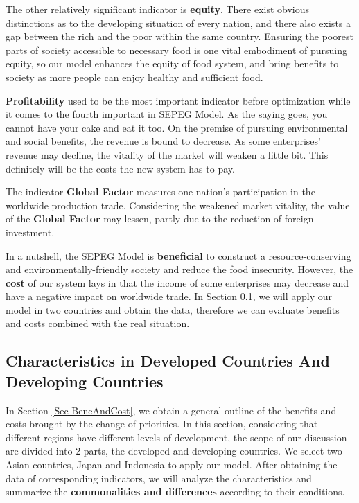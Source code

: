 \documentclass{mcmthesis}
\begin{document}
The other relatively significant indicator is \textbf{equity}. There exist obvious distinctions as to the developing situation of every nation, and there also exists a gap between the rich and the poor within the same country. Ensuring the poorest parts of society accessible to necessary food is one vital embodiment of pursuing equity, so our model enhances the equity of food system, and bring benefits to society as more people can enjoy healthy and sufficient food.

\textbf{Profitability} used to be the most important indicator before optimization while it comes to the fourth important in SEPEG Model. As the saying goes, you cannot have your cake and eat it too. On the premise of pursuing environmental and social benefits, the revenue is bound to decrease. As some enterprises' revenue may decline, the vitality of the market will weaken a little bit. This definitely will be the costs the new system has to pay.

The indicator \textbf{Global Factor} measures one nation's participation in the worldwide production trade. Considering the weakened market vitality, the value of the \textbf{Global Factor} may lessen, partly due to the reduction of foreign investment. 

In a nutshell, the SEPEG Model is \textbf{beneficial} to construct a resource-conserving and environmentally-friendly society and reduce the food insecurity. However, the \textbf{cost} of our system lays in that the income of some enterprises may decrease and have a negative impact on worldwide trade. In Section \ref{Sec-Char}, we will apply our model in two countries and obtain the data, therefore we can evaluate benefits and costs combined with the real situation. 



 \subsection{Characteristics in Developed Countries And Developing Countries}
 \label{Sec-Char}

In Section \ref{Sec-BeneAndCost}, we obtain a general outline of the benefits and costs brought by the change of priorities. In this section, considering that different regions have different levels of development, the scope of our discussion are divided into 2 parts, the developed and developing countries. We select two Asian countries, Japan and Indonesia to apply our model. After obtaining the data of corresponding indicators, we will analyze the characteristics and summarize the \textbf{commonalities and differences} according to their conditions.
\end{document}

